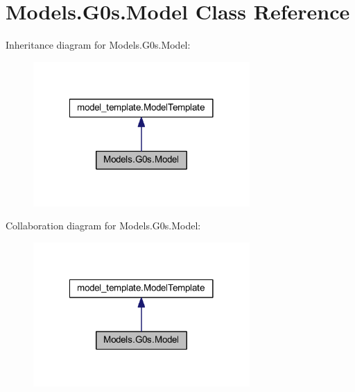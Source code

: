 \hypertarget{class_models_1_1_g0s_1_1_model}{\section{Models.\-G0s.\-Model Class Reference}
\label{class_models_1_1_g0s_1_1_model}
}


Inheritance diagram for Models.\-G0s.\-Model\-:
\nopagebreak
\begin{figure}[H]
\begin{center}
\leavevmode
\includegraphics[width=234pt]{class_models_1_1_g0s_1_1_model__inherit__graph}
\end{center}
\end{figure}


Collaboration diagram for Models.\-G0s.\-Model\-:
\nopagebreak
\begin{figure}[H]
\begin{center}
\leavevmode
\includegraphics[width=234pt]{class_models_1_1_g0s_1_1_model__coll__graph}
\end{center}
\end{figure}
